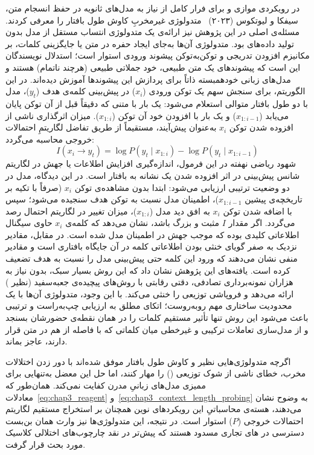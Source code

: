 در رویکردی موازی و برای فرار کامل از نیاز به مدل‌های ثانویه در حفظ انسجام متن، سیفکا و لیوتکوس (۲۰۲۳)~\cite{cifka2023blackbox} متدولوژی غیرمخربِ کاوش طول بافتار را معرفی کردند. مسئله‌ی اصلی در این پژوهش نیز ارائه‌ی یک متدولوژی انتساب مستقل از مدل بدون تولید داده‌های  بود. متدولوژی آن‌ها به‌جای ایجاد حفره در متن یا جایگزینی کلمات، بر مکانیزم افزودن تدریجی و توکن‌به‌توکن پیشوند ورودی استوار است؛ استدلال نویسندگان این است که پیشوندهای یک متن طبیعی، خود جملاتی طبیعی (هرچند ناتمام) هستند و مدل‌های زبانی خودهمبسته ذاتاً برای پردازش این پیشوندها آموزش دیده‌اند. در این الگوریتم، برای سنجش سهم یک توکن ورودی ($x_i$) در پیش‌بینی کلمه‌ی هدف ($y_t$)، مدل با دو طول بافتار متوالی استعلام می‌شود: یک بار با متنی که دقیقاً قبل از آن توکن پایان می‌یابد ($x_{1:i-1}$) و یک بار با افزودن خود آن توکن ($x_{1:i}$). میزان اثرگذاری ناشی از افزوده شدن توکن $x_i$ به‌عنوان پیش‌آیند، مستقیماً از طریق تفاضل لگاریتمِ احتمالات خروجی محاسبه می‌گردد:
\begin{equation}\label{eq:chap3_context_length_probing}
    I(x_i \rightarrow y_t) = \log P(y_t \mid x_{1:i}) - \log P(y_t \mid x_{1:i-1})
\end{equation}
شهود ریاضی نهفته در این فرمول، اندازه‌گیری افزایش اطلاعات یا جهش در لگاریتم شانس پیش‌بینی در اثر افزوده شدن یک نشانه به بافتار است. در این دیدگاه، مدل در دو وضعیت ترتیبی ارزیابی می‌شود: ابتدا بدون مشاهده‌ی توکن $x_i$ (صرفاً با تکیه بر تاریخچه‌ی پیشین $x_{1:i-1}$)، اطمینان مدل نسبت به توکن هدف سنجیده می‌شود؛ سپس با اضافه شدن توکن $x_i$ به افق دید مدل ($x_{1:i}$)، میزان تغییر در لگاریتم احتمال رصد می‌گردد. اگر مقدار $I$ مثبت و بزرگ باشد، نشان می‌دهد که کلمه‌ی $x_i$ حاوی سیگنال اطلاعاتی کلیدی بوده که موجب جهش در اطمینان مدل شده است. در مقابل، مقادیر نزدیک به صفر گویای خنثی بودن اطلاعاتی کلمه در آن جایگاه بافتاری است و مقادیر منفی نشان می‌دهند که ورود این کلمه حتی پیش‌بینی مدل را نسبت به هدف تضعیف کرده است. یافته‌های این پژوهش نشان داد که این روش بسیار سبک، بدون نیاز به هزاران نمونه‌برداری تصادفی، دقتی رقابتی با روش‌های پیچیده‌ی جعبه‌سفید (نظیر ) ارائه می‌دهد و فروپاشی توزیعی را خنثی می‌کند. با این وجود، متدولوژی آن‌ها با یک محدودیت ساختاری مهم روبه‌روست؛ اتکای مطلق به ارزیابی چپ‌به‌راست و ترتیبی باعث می‌شود این روش تنها تأثیر مستقیم کلمات را در همان نقطه‌ی حضورشان بسنجد و از مدل‌سازی تعاملات ترکیبی و غیرخطی میان کلماتی که با فاصله از هم در متن قرار دارند، عاجز بماند.

اگرچه متدولوژی‌هایی نظیر  و کاوش طول بافتار موفق شده‌اند با دور زدن اختلالات مخرب، خطای ناشی از شوک توزیعی () را مهار کنند، اما حل این معضل به‌تنهایی برای ممیزی مدل‌های زبانیِ مدرن کفایت نمی‌کند. همان‌طور که معادلات~\ref{eq:chap3_reagent} و~\ref{eq:chap3_context_length_probing} به وضوح نشان می‌دهند، هسته‌ی محاسباتیِ این رویکردهای نوین همچنان بر استخراج مستقیم لگاریتم احتمالات خروجی ($P$) استوار است. در نتیجه، این متدولوژی‌ها نیز وارث همان بن‌بست دسترسی در های تجاری مسدود هستند که پیش‌تر در نقد چارچوب‌های اختلالی کلاسیک مورد بحث قرار گرفت.

